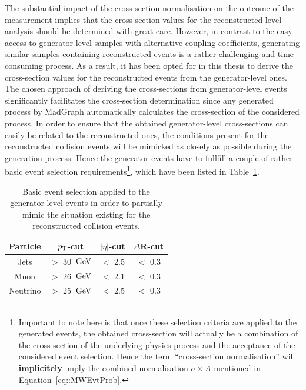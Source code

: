 The substantial impact of the cross-section normalisation on the outcome of the measurement implies that the cross-section values for the reconstructed-level analysis should be determined with great care.
However, in contrast to the easy access to generator-level samples with alternative coupling coefficients, generating similar samples containing reconstructed events is a rather challenging and time-consuming process.
As a result, it has been opted for in this thesis to derive the cross-section values for the reconstructed events from the generator-level ones.
\\

The chosen approach of deriving the cross-sections from generator-level events significantly facilitates the cross-section determination since any generated process by MadGraph automatically calculates the cross-section of the considered process.
In order to ensure that the obtained generator-level cross-sections can easily be related to the reconstructed ones, the conditions present for the reconstructed collision events will be mimicked as closely as possible during the generation process. Hence the generator events have to fullfill a couple of rather basic event selection requirements\footnote{Important to note here is that once these selection criteria are applied to the generated events, the obtained cross-section will actually be a combination of the cross-section of the underlying physics process and the acceptance of the considered event selection. Hence the term ``cross-section normalisation'' will \textbf{implicitely} imply the combined normalisation $\sigma \times A$ mentioned in Equation~\ref{eq::MWEvtProb}.}, which have been listed in Table~\ref{table::GenCuts}.

\begin{table}[h!t]
 \centering
 \caption{Basic event selection applied to the generator-level events in order to partially mimic the situation existing for the reconstructed collision events.} \label{table::GenCuts}
 \begin{tabular}{c|c|c|c}
  Particle 	& $p_{\rm T}$-cut 		& $\vert \eta \vert$-cut 	& $\Delta$R-cut 	\\
  \hline
  Jets 		& $>$ 30 $\, \mathrm{GeV}$ 	& $<$ 2.5			& $<$ 0.3		\\
  Muon		& $>$ 26 $\, \mathrm{GeV}$		& $<$ 2.1			& $<$ 0.3		\\
  Neutrino 	& $>$ 25 $\, \mathrm{GeV}$		& $<$ 2.5			& $<$ 0.3		
 \end{tabular}
\end{table}

